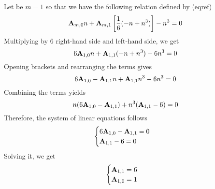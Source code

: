 \begin{examp}
    Let be $m=1$ so that we have the following relation defined by (eqref)
    \begin{equation*}
        {\mathbf{A}} \sb{m,0} n + {\mathbf{A}} \sb{m,1} \left[ \frac{1}{6} (-n + n^3) \right] -n^3 = 0
    \end{equation*}
    Multiplying by $6$ right-hand side and left-hand side, we get
    \begin{equation*}
        6{\mathbf{A}} \sb{1,0} n + {\mathbf{A}} \sb{1,1} (-n + n^3) - 6n^3 = 0
    \end{equation*}
    Opening brackets and rearranging the terms gives
    \begin{equation*}
        6 {\mathbf{A}} \sb{1,0} - {\mathbf{A}} \sb{1,1} n + {\mathbf{A}} \sb{1,1} n^3 - 6n^3 = 0
    \end{equation*}
    Combining the terms yields
    \begin{equation*}
        n(6{\mathbf{A}} \sb{1,0} - {\mathbf{A}} \sb{1,1}) + n^3 ({\mathbf{A}} \sb{1,1} - 6) = 0
    \end{equation*}
    Therefore, the system of linear equations follows
    \begin{equation*}
        \begin{cases}
            6 {\mathbf{A}} \sb{1,0} - {\mathbf{A}} \sb{1,1} = 0 \\
            {\mathbf{A}} \sb{1,1} - 6 = 0
        \end{cases}
    \end{equation*}
    Solving it, we get
    \begin{equation*}
        \begin{cases}
            {\mathbf{A}} \sb{1,1} = 6 \\
            {\mathbf{A}} \sb{1,0} = 1
        \end{cases}
    \end{equation*}
\end{examp}